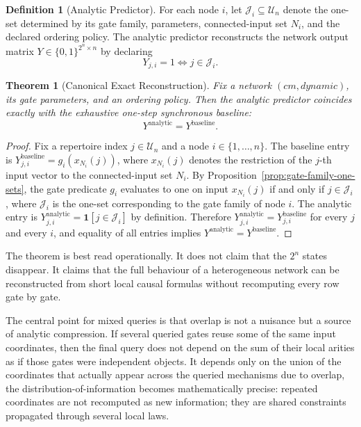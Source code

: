 \documentclass[11pt]{article}
\newtheorem{theorem}{Theorem}
\theoremstyle{definition}
\newtheorem{definition}{Definition}
\newcommand{\U}{\mathcal{U}_n}
\newcommand{\J}{\mathcal{J}}
\newcommand{\bits}{\{0,1\}}
\begin{document}
\begin{definition}[Analytic Predictor]
For each node \(i\), let \(\J_i\subseteq\U\) denote the one-set determined by its gate family, parameters, connected-input set \(N_i\), and the declared ordering policy. The analytic predictor reconstructs the network output matrix \(Y\in\bits^{2^n\times n}\) by declaring
\[
Y_{j,i}=1 \iff j\in \J_i.
\]
\end{definition}

\begin{theorem}[Canonical Exact Reconstruction]\label{thm:canonical-reconstruction}
Fix a network \((cm,dynamic)\), its gate parameters, and an ordering policy. Then the analytic predictor coincides exactly with the exhaustive one-step synchronous baseline:
\[
Y^{\mathrm{analytic}}=Y^{\mathrm{baseline}}.
\]
\end{theorem}

\begin{proof}
Fix a repertoire index \(j\in\U\) and a node \(i\in\{1,\ldots,n\}\). The baseline entry is \(Y^{\mathrm{baseline}}_{j,i}=g_i(x_{N_i}(j))\), where \(x_{N_i}(j)\) denotes the restriction of the \(j\)-th input vector to the connected-input set \(N_i\). By Proposition~\ref{prop:gate-family-one-sets}, the gate predicate \(g_i\) evaluates to one on input \(x_{N_i}(j)\) if and only if \(j\in\J_i\), where \(\J_i\) is the one-set corresponding to the gate family of node \(i\). The analytic entry is \(Y^{\mathrm{analytic}}_{j,i}=\mathbf{1}[j\in\J_i]\) by definition. Therefore \(Y^{\mathrm{analytic}}_{j,i}=Y^{\mathrm{baseline}}_{j,i}\) for every \(j\) and every \(i\), and equality of all entries implies \(Y^{\mathrm{analytic}}=Y^{\mathrm{baseline}}\).
\end{proof}

The theorem is best read operationally. It does not claim that the \(2^n\) states disappear. It claims that the full behaviour of a heterogeneous network can be reconstructed from short local causal formulas without recomputing every row gate by gate.

The central point for mixed queries is that overlap is not a nuisance but a source of analytic compression. 
If several queried gates reuse some of the same input coordinates, then the final query does not depend 
on the sum of their local arities as if those gates were independent objects. It depends only on the 
union of the coordinates that actually appear across the queried mechanisms due to overlap, 
the distribution-of-information becomes mathematically precise: repeated 
coordinates are not recomputed as new information; they are shared constraints propagated 
through several local laws.
\end{document}
